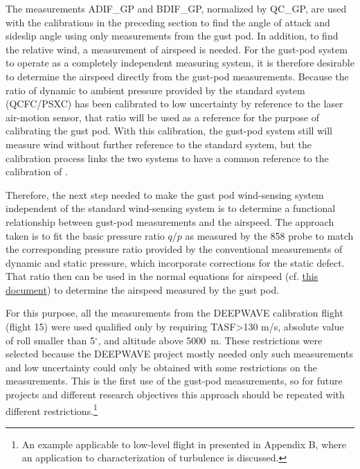 \documentclass[12pt,twoside,english]{article}\usepackage[]{graphicx}\usepackage[]{color}
\let\OrgIndex\index
\renewcommand*{\index}[1]{\OrgIndex{#1}}
\begin{document}
The measurements ADIF\_GP and BDIF\_GP, normalized by QC\_GP, are used with the calibrations in the preceding section to find the angle of attack and sideslip angle using only measurements from the gust pod. In addition, to find the relative wind, a measurement of airspeed is needed. For the gust-pod system to operate as a completely independent measuring system, it is therefore desirable to determine the  airspeed directly from the gust-pod measurements. Because the ratio of dynamic to ambient pressure provided by the standard system (QCFC/PSXC) has been calibrated to low uncertainty by reference to the laser air-motion sensor, that ratio will be used as a reference for the purpose of calibrating the gust pod. With this calibration, the gust-pod system still will measure wind without further reference to the standard system, but the calibration process links the two systems to have a common reference to the calibration of \citet{CooperEtAl2014}. 

Therefore, the next step needed to make the gust pod wind-sensing system independent of the standard wind-sensing system is to determine a functional relationship between gust-pod measurements and the airspeed. The approach taken is to fit the basic pressure ratio $q/p$ as measured by the 858 probe to match the corresponding pressure ratio provided by the conventional measurements of dynamic and static pressure, which incorporate corrections for the static defect. That ratio then can be used in the normal equations for airspeed (cf. \href{https://drive.google.com/open?id=0B1kIUH45ca5Ab2Z6cld1M1cydjA&authuser=0}{this document}) to determine the airspeed measured by the gust pod. 

For this purpose, all the measurements from the DEEPWAVE calibration flight (flight 15) were used qualified only by requiring TASF>130 m/s, absolute value of roll smaller than 5$^{\circ}$, and altitude above 5000~m. These restrictions were selected because the DEEPWAVE project mostly needed only such measurements and low uncertainty could only be obtained with some restrictions on the measurements. This is the first use of the gust-pod measurements, so for future projects and different research objectives this approach should be repeated with different restrictions.\footnote{An example applicable to low-level flight in presented in Appendix B, where an application to characterization of turbulence is discussed.} 
\end{document}
